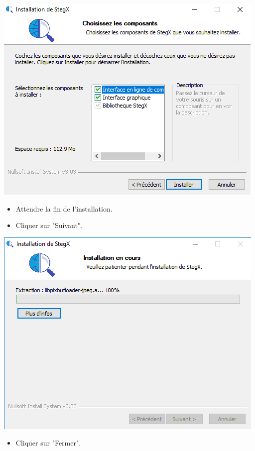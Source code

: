 \documentclass[11pt]{article}
\begin{document}
\hspace{1cm}
\includegraphics[scale=1]{pictures/choix.png}
\vspace{1cm}

\begin{itemize}
\item Attendre la fin de l'installation.
\item Cliquer sur "Suivant". 
\end{itemize}

\hspace{2.5cm}
\includegraphics[scale=0.8]{pictures/installation.png}
\vspace{1cm}

\newpage
\begin{itemize}
\item Cliquer sur "Fermer". 
\end{itemize}
\end{document}
